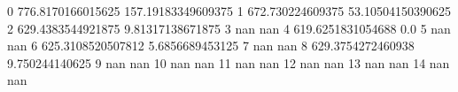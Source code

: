 0 776.8170166015625 157.19183349609375
1 672.730224609375 53.10504150390625
2 629.4383544921875 9.81317138671875
3 nan nan
4 619.6251831054688 0.0
5 nan nan
6 625.3108520507812 5.6856689453125
7 nan nan
8 629.3754272460938 9.750244140625
9 nan nan
10 nan nan
11 nan nan
12 nan nan
13 nan nan
14 nan nan
